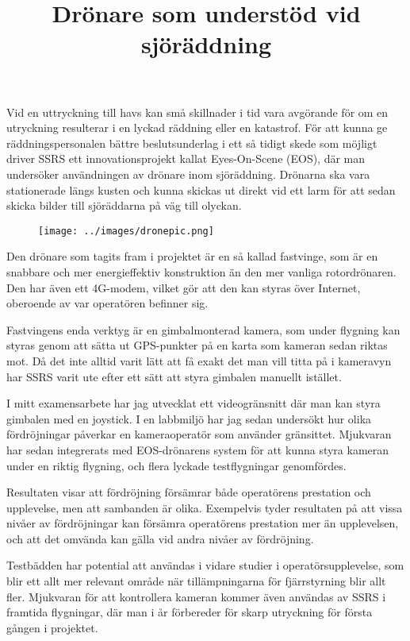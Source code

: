 \documentclass{popsci}
\title{Drönare som understöd vid sjöräddning}
\begin{document}

{\noindent Vid en uttryckning till havs kan små skillnader i tid vara avgörande för om en utryckning resulterar i en lyckad räddning eller en katastrof. För att kunna ge räddningspersonalen bättre beslutsunderlag i ett så tidigt skede som möjligt driver SSRS ett innovationsprojekt kallat Eyes-On-Scene (EOS), där man undersöker användningen av drönare inom sjöräddning. Drönarna ska vara stationerade längs kusten och kunna skickas ut direkt vid ett larm för att sedan skicka bilder till sjöräddarna på väg till olyckan.

\begin{figure}[!bth] %
    \texttt{[image: ../images/dronepic.png]} 
\end{figure}

Den drönare som tagits fram i projektet är en så kallad fastvinge, som är en snabbare och mer energieffektiv konstruktion än den mer vanliga rotordrönaren. Den har även ett 4G-modem, vilket gör att den kan styras över Internet, oberoende av var operatören befinner sig. 

Fastvingens enda verktyg är en gimbalmonterad kamera, som under flygning kan styras genom att sätta ut GPS-punkter på en karta som kameran sedan riktas mot. Då det inte alltid varit lätt att få exakt det man vill titta på i kameravyn har SSRS varit ute efter ett sätt att styra gimbalen manuellt istället.

I mitt examensarbete har jag utvecklat ett videogränsnitt där man kan styra gimbalen med en joystick. I en labbmiljö har jag sedan undersökt hur olika fördröjningar påverkar en kameraoperatör som använder gränsittet. Mjukvaran har sedan integrerats med EOS-drönarens system för att kunna styra kameran under en riktig flygning, och flera lyckade testflygningar genomfördes. 

Resultaten visar att fördröjning försämrar både operatörens prestation och upplevelse, men att sambanden är olika. Exempelvis tyder resultaten på att vissa nivåer av fördröjningar kan försämra operatörens prestation mer än upplevelsen, och att det omvända kan gälla vid andra nivåer av fördröjning.

Testbädden har potential att användas i vidare studier i operatörsupplevelse, som blir ett allt mer relevant område när tillämpningarna för fjärrstyrning blir allt fler. Mjukvaran för att kontrollera kameran kommer även användas av SSRS i framtida flygningar, där man i år förbereder för skarp utryckning för första gången i projektet.
}
\end{document}
